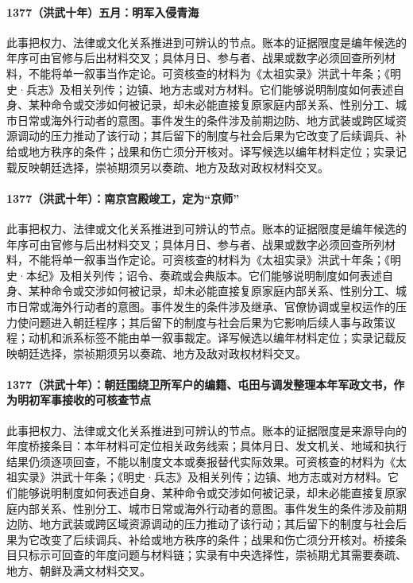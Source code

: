 \paragraph{1377（洪武十年）五月：明军入侵青海} 此事把权力、法律或文化关系推进到可辨认的节点。账本的证据限度是编年候选的年序可由官修与后出材料交叉；具体月日、参与者、战果或数字必须回查所列材料，不能将单一叙事当作定论。可资核查的材料为《太祖实录》洪武十年条；《明史·兵志》及相关列传；边镇、地方志或对方材料。它们能够说明制度如何表述自身、某种命令或交涉如何被记录，却未必能直接复原家庭内部关系、性别分工、城市日常或海外行动者的意图。事件发生的条件涉及前期边防、地方武装或跨区域资源调动的压力推动了该行动；其后留下的制度与社会后果为它改变了后续调兵、补给或地方秩序的条件；战果和伤亡须分开核对。译写候选以编年材料定位；实录记载反映朝廷选择，崇祯期须另以奏疏、地方及敌对政权材料交叉。

\paragraph{1377（洪武十年）：南京宫殿竣工，定为“京师”} 此事把权力、法律或文化关系推进到可辨认的节点。账本的证据限度是编年候选的年序可由官修与后出材料交叉；具体月日、参与者、战果或数字必须回查所列材料，不能将单一叙事当作定论。可资核查的材料为《太祖实录》洪武十年条；《明史·本纪》及相关列传；诏令、奏疏或会典版本。它们能够说明制度如何表述自身、某种命令或交涉如何被记录，却未必能直接复原家庭内部关系、性别分工、城市日常或海外行动者的意图。事件发生的条件涉及继承、官僚协调或皇权运作的压力使问题进入朝廷程序；其后留下的制度与社会后果为它影响后续人事与政策议程；动机和派系标签不能由单一叙事裁定。译写候选以编年材料定位；实录记载反映朝廷选择，崇祯期须另以奏疏、地方及敌对政权材料交叉。

\paragraph{1377（洪武十年）：朝廷围绕卫所军户的编籍、屯田与调发整理本年军政文书，作为明初军事接收的可核查节点} 此事把权力、法律或文化关系推进到可辨认的节点。账本的证据限度是来源导向的年度桥接条目：本年材料可定位相关政务线索；具体月日、发文机关、地域和执行结果仍须逐项回查，不能以制度文本或奏报替代实际效果。可资核查的材料为《太祖实录》洪武十年条；《明史·兵志》及相关列传；边镇、地方志或对方材料。它们能够说明制度如何表述自身、某种命令或交涉如何被记录，却未必能直接复原家庭内部关系、性别分工、城市日常或海外行动者的意图。事件发生的条件涉及前期边防、地方武装或跨区域资源调动的压力推动了该行动；其后留下的制度与社会后果为它改变了后续调兵、补给或地方秩序的条件；战果和伤亡须分开核对。桥接条目只标示可回查的年度问题与材料链；实录有中央选择性，崇祯期尤其需要奏疏、地方、朝鲜及满文材料交叉。

